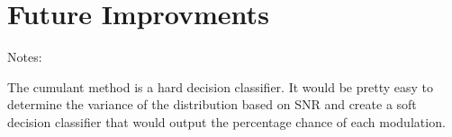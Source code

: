 \chapter{Future Improvments}

Notes:

The cumulant method is a hard decision classifier.  It would be pretty easy to
determine the variance of the distribution based on SNR and create a soft
decision classifier that would output the percentage chance of each modulation.
